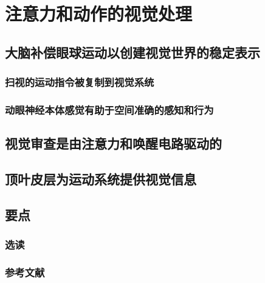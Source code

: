 \chapter{注意力和动作的视觉处理}

\section{大脑补偿眼球运动以创建视觉世界的稳定表示}
\subsection{扫视的运动指令被复制到视觉系统}
\subsection{动眼神经本体感觉有助于空间准确的感知和行为}

\section{视觉审查是由注意力和唤醒电路驱动的}

\section{顶叶皮层为运动系统提供视觉信息}

\section{要点}
\subsection{选读}
\subsection{参考文献}